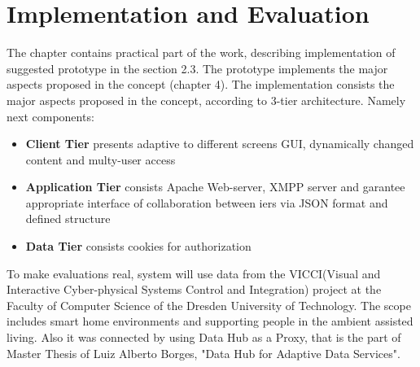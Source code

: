 \chapter{Implementation and Evaluation}
	The chapter contains practical part of the work, describing implementation of suggested prototype in the section
	2.3. The prototype implements the major aspects proposed in the concept (chapter 4).
	The implementation consists the major aspects proposed in the concept, according to 3-tier architecture. Namely next components:
	 \begin{itemize}
		\item \textbf{Client Tier} presents adaptive to different screens GUI, dynamically changed content and multy-user access
		\item \textbf{Application Tier} consists Apache Web-server, XMPP server and garantee appropriate interface of collaboration between iers via JSON format and defined structure
		\item \textbf{Data Tier} consists cookies for authorization
	\end{itemize}
	To make evaluations real, system will use data from the VICCI(Visual and Interactive Cyber-physical Systems Control and Integration) project at the Faculty of Computer Science of the Dresden University of Technology. The scope includes smart home environments and supporting people in the ambient assisted living. Also it was connected by using Data Hub as a Proxy, that is the part of Master Thesis of Luiz Alberto Borges, "Data Hub for Adaptive Data Services".
